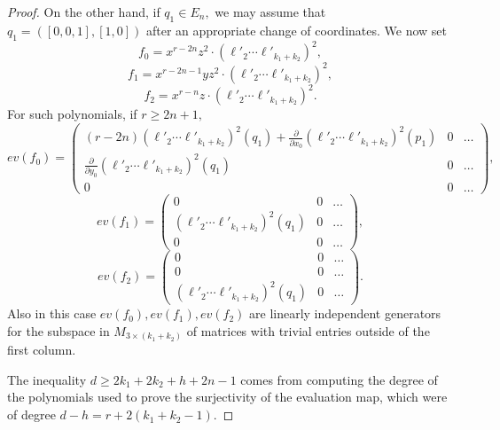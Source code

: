 \documentclass[10pt,a4paper,twoside]{amsart}
\theoremstyle{plain}
\theoremstyle{definition}
\theoremstyle{remark}
\begin{document}
\begin{proof}
On the other hand, if $q_1\in E_n,$ we may assume that $q_1=(\left[0,0,1\right],\left[1,0\right])$ after an appropriate change of coordinates.
We now set
$$f_0=x^{r-2n}z^2\cdot(\ell'_2\cdots\ell'_{k_1+k_2})^2,$$
$$f_1=x^{r-2n-1}yz^2\cdot(\ell'_2\cdots\ell'_{k_1+k_2})^2,$$
$$f_2=x^{r-n}z\cdot(\ell'_2\cdots\ell'_{k_1+k_2})^2.$$
For such polynomials, if $r\geq 2n+1,$
\begin{equation*}
ev(f_0)=\begin{pmatrix}(r-2n)(\ell'_2\cdots\ell'_{k_1+k_2})^2(q_1)+\frac{\partial}{\partial x_0}(\ell'_2\cdots\ell'_{k_1+k_2})^2(p_1)&0&\dots\\ \frac{\partial}{\partial y_0}(\ell'_2\cdots\ell'_{k_1+k_2})^2(q_1)&0&\dots\\ 0&0&\dots\end{pmatrix},
\end{equation*}
\begin{equation*}
ev(f_1)=\begin{pmatrix}0&0&\dots\\ (\ell'_2\cdots\ell'_{k_1+k_2})^2(q_1)&0&\dots\\ 0&0&\dots\end{pmatrix},
\end{equation*}
\begin{equation*}
ev(f_2)=\begin{pmatrix}0&0&\dots\\ 0&0&\dots\\(\ell'_2\cdots\ell'_{k_1+k_2})^2(q_1)&0&\dots\end{pmatrix}.
\end{equation*}
Also in this case $ev(f_0),ev(f_1),ev(f_2)$ are linearly independent generators for the subspace in $M_{3\times ({k_1+k_2})}$ of matrices with trivial entries outside of the first column. 

The inequality $d\geq 2k_1+2k_2+h+2n-1$ comes from computing the 
degree of the polynomials used to prove the surjectivity of the evaluation map, 
which were of degree $d-h=r+2({k_1+k_2}-1)$. 
\end{proof}
\end{document}
